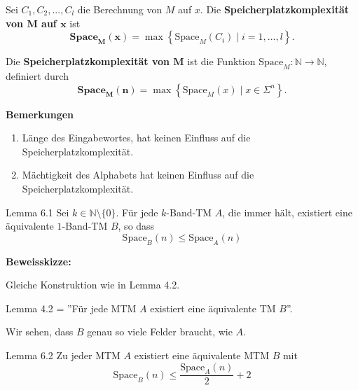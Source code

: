 \documentclass[a4paper, 11pt]{article}
\def\N{\mathbb{N}}
\begin{document}
                            \begin{mainbox}{}
                                Sei $C_1, C_2, ..., C_l$ die Berechnung von $M$ auf $x$. Die \textbf{Speicherplatzkomplexität von $\mathbf{M}$ auf $\mathbf{x}$} ist 
                                $$\mathbf{\textbf{Space}_M(x) }= \max\left\{\text{Space}_M(C_i) \mid i = 1, ..., l\right\}.$$
                                
                                Die \textbf{Speicherplatzkomplexität von $\mathbf{M}$} ist die Funktion $\text{Space}_M: \N \to \N$, definiert durch 
                                $$\mathbf{\textbf{Space}_M(n)} = \max\left\{\text{Space}_M(x) \mid x \in \Sigma^n\right\}.$$
                            \end{mainbox}
                        
                            \textbf{Bemerkungen}
                            \begin{enumerate}[label=\arabic*.]
                                \item Länge des Eingabewortes, hat keinen Einfluss auf die Speicherplatzkomplexität.
                                \item Mächtigkeit des Alphabets hat keinen Einfluss auf die Speicherplatzkomplexität.
                            \end{enumerate}
                            
                     
                            \begin{mainbox}{Lemma 6.1}
                                Sei $k \in \N\setminus\{0\}$. Für jede $k$-Band-TM $A$, die immer hält, existiert eine äquivalente $1$-Band-TM $B$, so dass 
                                $$\text{Space}_B(n) \leq \text{Space}_A(n)$$
                            \end{mainbox}
                            
                            \textbf{Beweisskizze: }
                        
                            Gleiche Konstruktion wie in Lemma 4.2.
                            
                            Lemma 4.2 = ''Für jede MTM $A$ existiert eine äquivalente TM $B$''. 
                            
                            Wir sehen, dass $B$ genau so viele Felder braucht, wie $A$.
                        
                            \begin{mainbox}{Lemma 6.2}
                                Zu jeder MTM $A$ existiert eine äquivalente MTM $B$ mit 
                                $$\text{Space}_B(n) \leq \frac{\text{Space}_A(n)}{2}+2$$
                            \end{mainbox}
                            
\end{document}
